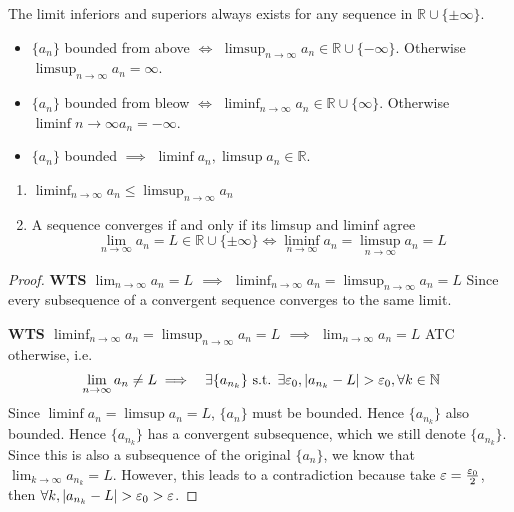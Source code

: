 \begin{remark}
    The limit inferiors and superiors always exists for any sequence 
    in $\mathbb{R} \cup \{ \pm \infty \} $.
    \begin{itemize}
        \item $\{ a_n \} $ bounded from above $\iff$ 
        $\limsup_{n \to \infty} a_n \in \mathbb{R} \cup \{ -\infty \} $. 
        Otherwise $\limsup_{n \to \infty} a_n = \infty$. 
        \item $\{ a_n \} $ bounded from bleow $\iff$ 
        $\liminf_{n \to \infty} a_n \in \mathbb{R} \cup \{ \infty \} $. 
        Otherwise $\liminf{n \to \infty} a_n = -\infty$. 
        \item $\{ a_n \} $ bounded $\implies$
        $\liminf a_n, \limsup a_n \in \mathbb{R}$.
    \end{itemize} 
\end{remark}


\begin{proposition}
    \hfill
    \begin{enumerate}
        \item $\liminf_{n \to \infty} a_n \leq \limsup_{n \to \infty}a_n$
        \item A sequence converges if and only if its limsup and liminf agree
        \[
            \lim_{n \to \infty} a_n = L \in \mathbb{R} \cup \{ \pm \infty \} 
            \iff 
            \liminf_{n \to \infty} a_n = 
            \limsup_{n \to \infty} a_n = 
            L
        \]
    \end{enumerate}
\end{proposition}
\begin{proof}
    \textbf{
        WTS
        $\lim_{n \to \infty} a_n = L$
        $\implies$
        $\liminf_{n \to \infty} a_n = \limsup_{n \to \infty} a_n = L$
    }
    Since every subsequence of a convergent sequence converges to the 
    same limit.
    \medskip

    \textbf{
        WTS
        $\liminf_{n \to \infty} a_n = \limsup_{n \to \infty} a_n = L$
        $\implies$
        $\lim_{n \to \infty} a_n = L$
    }
    ATC otherwise, i.e. 
    \begin{align*}
        & \lim_{n \to \infty} a_{n} \neq L 
        \implies & \exists \{ a_{n_k} \} \text{ s.t. }
        \exists \varepsilon_0, |a_{n_k} - L | > \varepsilon_0, \forall k \in \mathbb{N}
    \end{align*}
    Since $\liminf a_n = \limsup a_n = L$, $\{ a_n \} $ 
    must be bounded. Hence $ \{ a_{n_k} \} $ also bounded.
    Hence $\{ a_{n_k} \} $ has a convergent subsequence,
    which we still denote $\{ a_{n_k} \} $. 
    Since this is also a subsequence of the original $\{ a_n \} $, we know 
    that $\lim_{k \to \infty}a_{n_k} = L$. However, this leads
    to a contradiction because take $\varepsilon = \frac{\varepsilon_0}{2}$, then
    $\forall k, |a_{n_k} - L | > \varepsilon_0 > \varepsilon$.
\end{proof}


